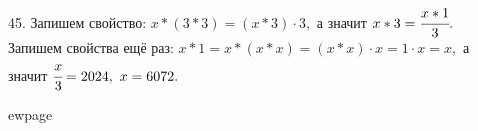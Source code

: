 45. Запишем свойство: $x*(3*3)=(x*3)\cdot3,$ а значит $x*3=\cfrac{x*1}{3}.$ Запишем свойства ещё раз: $x*1=x*(x*x)=(x*x)\cdot x=1\cdot x=x,$ а значит
$\cfrac{x}{3}=2024,\ x=6072.$

ewpage
